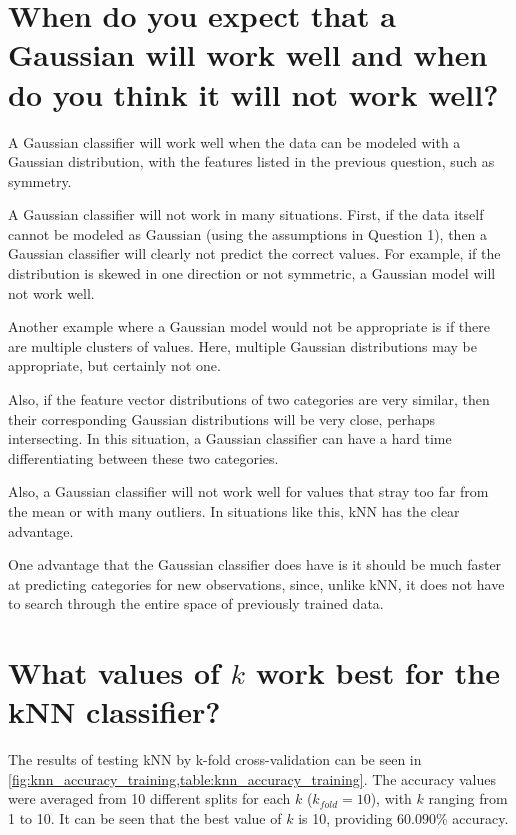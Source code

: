 \documentclass[a4paper,titlepage]{article}
\begin{document}
	\section{When do you expect that a Gaussian will work well and when do you think it will not work well?}
	
	A Gaussian classifier will work well when the data can be modeled with a Gaussian distribution, with the features listed in the previous question, such as symmetry.
	
	A Gaussian classifier will not work in many situations. First, if the data itself cannot be modeled as Gaussian (using the assumptions in Question 1), then a Gaussian classifier will clearly not predict the correct values. For example, if the distribution is skewed in one direction or not symmetric, a Gaussian model will not work well.
	
	Another example where a Gaussian model would not be appropriate is if there are multiple clusters of values. Here, multiple Gaussian distributions may be appropriate, but certainly not one.
	
	Also, if the feature vector distributions of two categories are very similar, then their corresponding Gaussian distributions will be very close, perhaps intersecting. In this situation, a Gaussian classifier can have a hard time differentiating between these two categories.
	
	Also, a Gaussian classifier will not work well for values that stray too far from the mean or with many outliers. In situations like this, kNN has the clear advantage.
	
	One advantage that the Gaussian classifier does have is it should be much faster at predicting categories for new observations, since, unlike kNN, it does not have to search through the entire space of previously trained data.
	
	\section{What values of $k$ work best for the kNN classifier?}

	The results of testing kNN by k-fold cross-validation can be seen in \cref{fig:knn_accuracy_training,table:knn_accuracy_training}. The accuracy values were averaged from 10 different splits for each $k$ ($k_{fold} = 10$), with $k$ ranging from 1 to 10. It can be seen that the best value of $k$ is 10, providing $60.090\%$ accuracy.
	
\end{document}
